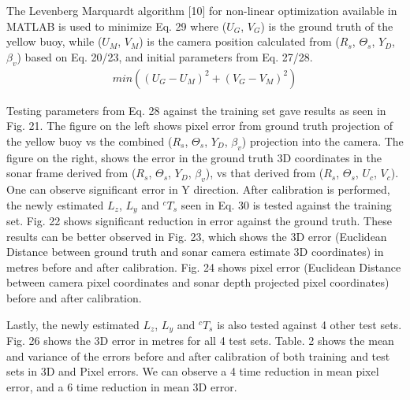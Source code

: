 \documentclass[15pt]{article}
\let\Theta\varTheta
\newcommand{\RSonar}{$\si{\textit{R}_{s}}$\xspace}
\newcommand{\ThetaSonar}{$\si{\Theta_{s}}$\xspace}
\newcommand{\UCamera}{$\si{\textit{U}_{c}}$\xspace}
\newcommand{\VCamera}{$\si{\textit{V}_{c}}$\xspace}
\newcommand{\YDepth}{$Y_{D}$\xspace}
\newcommand{\PitchVehicle}{${\beta_{v}}$\xspace}
\begin{document}
The Levenberg Marquardt algorithm [10] for non-linear optimization available in MATLAB is used to minimize Eq. 29 where ($U_{G}$, $V_{G}$) is the ground truth of the yellow buoy, while ($U_{M}$, $V_{M}$) is the camera position calculated from (\RSonar, \ThetaSonar, \YDepth, \PitchVehicle) based on Eq. 20/23, and initial parameters from Eq. 27/28.
\begin{gather}
min(\left(U_{G}-U_{M}\right)^{2}+\left(V_{G}-V_{M}\right)^{2})
\end{gather}

Testing parameters from Eq. 28 against the training set gave results as seen in Fig. 21. The figure on the left shows pixel error from ground truth projection of the yellow buoy vs the combined (\RSonar, \ThetaSonar, \YDepth, \PitchVehicle) projection into the camera. The figure on the right, shows the error in the ground truth 3D coordinates in the sonar frame derived from (\RSonar, \ThetaSonar, \YDepth, \PitchVehicle), vs that derived from (\RSonar, \ThetaSonar, \UCamera, \VCamera). One can observe significant error in Y direction. After calibration is performed, the newly estimated $L_{z}$, $L_{y}$ and $^{c}T_{s}$ seen in Eq. 30 is tested against the training set. Fig. 22 shows significant reduction in error against the ground truth. These results can be better observed in Fig. 23, which shows the 3D error (Euclidean Distance between ground truth and sonar camera estimate 3D coordinates) in metres before and after calibration. Fig. 24 shows pixel error (Euclidean Distance between camera pixel coordinates and sonar depth projected pixel coordinates) before and after calibration.

Lastly, the newly estimated $L_{z}$, $L_{y}$ and $^{c}T_{s}$ is also tested against 4 other test sets. Fig. 26 shows the 3D error in metres for all 4 test sets. Table. 2 shows the mean and variance of the errors before and after calibration of both training and test sets in 3D and Pixel errors. We can observe a 4 time reduction in mean pixel error, and a 6 time reduction in mean 3D error.
\end{document}
